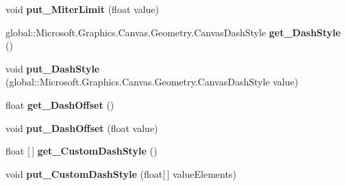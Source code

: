 \begin{DoxyCompactItemize}
void {\bfseries put\+\_\+\+Miter\+Limit} (float value)
\item 
\mbox{\label{interface_microsoft_1_1_graphics_1_1_canvas_1_1_geometry_1_1_i_canvas_stroke_style_a4e200c8b211b9a0372f10cfc99f37f85}} 
global\+::\+Microsoft.\+Graphics.\+Canvas.\+Geometry.\+Canvas\+Dash\+Style {\bfseries get\+\_\+\+Dash\+Style} ()
\item 
\mbox{\label{interface_microsoft_1_1_graphics_1_1_canvas_1_1_geometry_1_1_i_canvas_stroke_style_a3a3866d0af05bea0d5111d39bad2f7aa}} 
void {\bfseries put\+\_\+\+Dash\+Style} (global\+::\+Microsoft.\+Graphics.\+Canvas.\+Geometry.\+Canvas\+Dash\+Style value)
\item 
\mbox{\label{interface_microsoft_1_1_graphics_1_1_canvas_1_1_geometry_1_1_i_canvas_stroke_style_a261cdb6c0132a1ce93c7ecd652c1956d}} 
float {\bfseries get\+\_\+\+Dash\+Offset} ()
\item 
\mbox{\label{interface_microsoft_1_1_graphics_1_1_canvas_1_1_geometry_1_1_i_canvas_stroke_style_a470c5f115b6bf096380d61e538a59cad}} 
void {\bfseries put\+\_\+\+Dash\+Offset} (float value)
\item 
\mbox{\label{interface_microsoft_1_1_graphics_1_1_canvas_1_1_geometry_1_1_i_canvas_stroke_style_a01ec98472128934fc496593cee96dff2}} 
float \mbox{[}$\,$\mbox{]} {\bfseries get\+\_\+\+Custom\+Dash\+Style} ()
\item 
\mbox{\label{interface_microsoft_1_1_graphics_1_1_canvas_1_1_geometry_1_1_i_canvas_stroke_style_afc2f9171bd8e3a6ef7927abcbd756c59}} 
void {\bfseries put\+\_\+\+Custom\+Dash\+Style} (float\mbox{[}$\,$\mbox{]} value\+Elements)
\item 
\mbox{\label{interface_microsoft_1_1_graphics_1_1_canvas_1_1_geometry_1_1_i_canvas_stroke_style_a8c19df45244410757192563987bfbdfa}} 

\end{DoxyCompactItemize}
